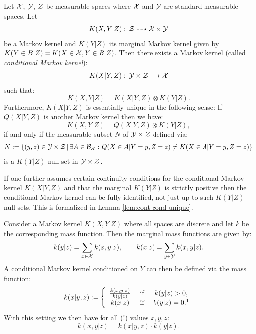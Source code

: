 \begin{DefThm}
    \label{thm-regular-conditional-Markov-kernel}
    Let $\mathcal{X}$, $\mathcal{Y}$, $\mathcal{Z}$ be measurable spaces where $\mathcal{X}$ and $\mathcal{Y}$ are standard measurable spaces.
    Let 
    \[ K(X,Y|Z):\, \mathcal{Z} \dashrightarrow \mathcal{X} \times \mathcal{Y}\]
    be a Markov kernel and $K(Y|Z)$ its marginal Markov kernel given by $K(Y\in B|Z) = K(X \in \mathcal{X}, Y \in B|Z)$.
    Then there exists a Markov kernel (called \emph{conditional Markov kernel}):
    \[ K(X|Y,Z):\, \mathcal{Y} \times \mathcal{Z} \dashrightarrow \mathcal{X}\]
    such that:
    \[   K(X,Y|Z) = K(X|Y,Z) \otimes K(Y|Z).\]
    Furthermore, $K(X|Y,Z)$ is essentially unique in the following sense:
    If $Q(X|Y,Z)$ is another Markov kernel 
    then we have:
    \[ K(X,Y|Z) = Q(X|Y,Z) \otimes K(Y|Z),\]
    if and only if the measurable subset $N$ of $\mathcal{Y} \times \mathcal{Z}$ defined via:
    \[ N:= \left \{ (y,z) \in \mathcal{Y} \times \mathcal{Z} \,|\, \exists A \in \mathcal{B}_{\mathcal{X}}:\, Q(X \in A|Y=y,Z=z) \neq K(X \in A|Y=y,Z=z)\right \}  \]
    is a $K(Y|Z)$-null set in $\mathcal{Y} \times \mathcal{Z}$.
\end{DefThm}

\begin{Rem}
    If one further assumes certain continuity conditions for the conditional Markov kernel $K(X|Y,Z)$ and that the marginal $K(Y|Z)$ is strictly positive then the conditional Markov kernel can be fully identified, not just up to such  $K(Y|Z)$-null sets. This is formalized in Lemma \ref{lem:cont-cond-unique}.
\end{Rem}

\begin{Eg}
    Consider a Markov kernel $K(X,Y|Z)$ where all spaces are discrete and let $k$ be the corresponding mass function.
    Then the marginal mass functions are given by:
    \[ k(y|z) = \sum_{x \in \mathcal{X}} k(x,y|z), \qquad k(x|z) = \sum_{y \in \mathcal{Y}} k(x,y|z). \]
    A conditional Markov kernel conditioned on $Y$ can then be defined via the mass function:
    \[
        k(x|y,z) := \left\{
            \begin{array}{cccc}
                \frac{k(x,y|z)}{k(y|z)} & \text{ if } & k(y|z) >0,\\
                k(x|z)& \text{ if } & k(y|z) = 0.\footnotemark
            \end{array}\right.
    \]
    With this setting we then have for all (!) values $x,y,z$:
    \[ k(x,y|z) = k(x|y,z) \cdot k(y|z). \]
\end{Eg}

